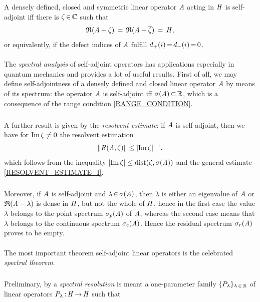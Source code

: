 \documentclass[11pt,twoside]{article}
\begin{document}
\begin{itemize}[leftmargin=4mm,itemsep=5pt]
\begin{theorem1}\label{RANGE_CONDITION}
A densely defined, closed and symmetric linear operator $\mathit{A}$
acting in $\mathit{H}$ is self-adjoint iff there is $\zeta {\,\in\,} {\mathbb{C}}$ such that
\[
\mathfrak{R}(\mathit{A} + \zeta) \,=\, \mathfrak{R}(\mathit{A} + \overline{\zeta}) \,=\, \mathit{H},
\]
or equivalently,
if the defect indices of $\mathit{A}$ fulfill $d_+(i) {\,=\,} d_-(i) {\,=\,} 0$.
\end{theorem1}

\paragraph{} %
The \textit{spectral analysis} of self-adjoint operators has applications
especially in quantum mechanics and provides a lot of useful results.
First of all,
we may define self-adjointness of a densely defined and closed linear operator
$\mathit{A}$ by means of its spectrum:
the operator $\mathit{A}$ is self-adjoint iff $\sigma(\mathit{A}) {\,\subset\,} {\mathbb{R}}$,
which is a consequence of the range condition \ref{RANGE_CONDITION}.

\subparagraph{} %
A further result is given by the \textit{resolvent estimate}:
if $\mathit{A}$ is self-adjoint,
then we have for $\operatorname{Im} \zeta \neq 0$ the resolvent estimation
\[
\norm{R(\linA,\zeta)} \leq \abs{\im \zeta} ^{-1},
\]
which follows from the inequality 
$\abs{\im \zeta} \leq \mbox{dist}(\zeta,\sigma(\linA))$
and the general estimate \eqref{RESOLVENT_ESTIMATE_I}.

\subparagraph{} %
Moreover,
if $\mathit{A}$ is self-adjoint and $\lambda {\,\in\,} \sigma(\mathit{A})$,
then $\lambda$ is either an eigenvalue of $\mathit{A}$
or $\mathfrak{R}(\mathit{A}-\lambda)$ is dense in $\mathit{H}$,
but not the whole of $\mathit{H}$,
hence in the first case the value $\lambda$
belongs to the {point spectrum} $\sigma_p(\mathit{A})$ of $\mathit{A}$,
whereas the second case means that $\lambda$ belongs
to the {continuous spectrum} $\sigma_c(\mathit{A})$.
Hence the {residual spectrum} $\sigma_r(\mathit{A})$ proves to be empty.

\paragraph{} %
The most important theorem {\wrt} self-adjoint linear operators
is the celebrated \textit{spectral theorem}.

\subparagraph{} %
Preliminary,
by a \textit{spectral resolution} is meant
a one-parameter family $\{{P}_{\lambda}\}_{\lambda {\,\in\,} {\mathbb{R}}}$
of linear operators ${P}_{\lambda} {\,:\,} \mathit{H} {\,\to\,} \mathit{H}$
such that


\end{itemize}
\end{document}
